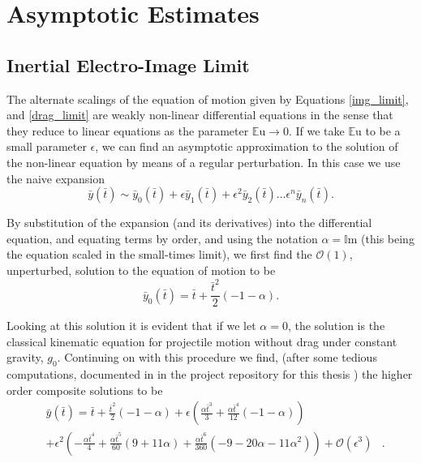 \documentclass[12pt,a4paper,oneside]{book}
\begin{document}
\section{Asymptotic Estimates}
\subsection{Inertial Electro-Image Limit}
The alternate scalings of the equation of motion given by Equations \ref{img_limit}, and \ref{drag_limit} are weakly non-linear differential equations in the sense that they reduce to linear equations as the parameter $\mathbb{E}\mbox{u} \rightarrow 0$. If we take $\mathbb{E}\mbox{u}$ to be a small parameter $\epsilon$, we can find an asymptotic approximation to the solution of the non-linear equation by means of a regular perturbation. In this case we use the naive expansion
\[ \bar{y}(\bar{t}) \sim \bar{y}_0(\bar{t}) + \epsilon \bar{y}_1(\bar{t}) + \epsilon^2 \bar{y}_2(\bar{t}) \ldots \epsilon^n\bar{y}_n(\bar{t})  
.\]

By substitution of the expansion (and its derivatives) into the differential equation, and equating terms by order, and using the notation $\alpha = \mathbb{I}\mbox{m}$ (this being the equation scaled in the small-times limit), we first find the $\mathcal{O}(1)$, unperturbed, solution to the equation of motion to be
\[{\bar{y}_{0}}{\left (\bar{t} \right )} = \bar{t} + \frac{\bar{t}^{2}}{2} \left(-1 - \alpha\right). \]

Looking at this solution it is evident that if we let $\alpha=0$, the solution is the classical kinematic equation for projectile motion without drag under constant gravity, $g_0$. Continuing on with this procedure we find, (after some tedious computations, documented in in the project repository for this thesis \cite{schmidt_droplet_electro-bounce:_2017}) the higher order composite solutions to be
\begin{eqnarray*}
&\bar{y}(\bar{t}) = \bar{t} + \frac{\bar{t}^{2}}{2} \left(-1 - \alpha\right) + \epsilon \left(\frac{\alpha \bar{t}^{3}}{3} + \frac{\alpha \bar{t}^{4}}{12} \left(-1 - \alpha\right)\right)& \\
&+ \epsilon^{2} \left(- \frac{\alpha \bar{t}^{4}}{4} + \frac{\alpha \bar{t}^{5}}{60} \left(9 + 11 \alpha\right) + \frac{\alpha \bar{t}^{6}}{360} \left(-9 - 20 \alpha - 11 \alpha^{2}\right)\right) + \mathcal{O}(\epsilon^3)&.
\end{eqnarray*}
\end{document}
